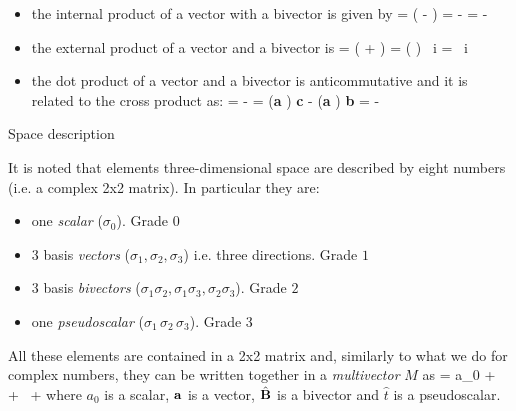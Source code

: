 \documentclass[handout,10pt]{beamer}
\begin{document}

\begin{frame}[fragile]{}
\begin{itemize}

\item the internal product of a vector with a bivector is given by
\be 
\Ba \cdot \hat{\BB}  =  \left(\Ba \hat{\BB} - \hat{\BB} \Ba \right) = - \Ba \times \Bb \times \Bc = - \Ba \times \BB
\ee
\item the external product of a vector and a bivector is
%
\be 
\Ba \wedge \hat{\BB}  =  \left(\Ba \hat{\BB} + \hat{\BB} \Ba \right) =  \Ba \cdot \left( \Bb \times \Bc\right) \,  i  =  \Ba \cdot  \BB  \,  i 
\ee

\item the dot product of a vector and a bivector is anticommutative and it is related to the cross product as:
\be \label{adbwcatbtccs}
\Ba \cdot \Bb \wedge \Bc = - \Ba \times \Bb \times \Bc = ({\bf a}  )    {\bf c} - ({\bf a}  )  {\bf b} = -\Bb \wedge \Bc \cdot \Ba
\ee

\end{itemize}

\end{frame}

\begin{frame}[fragile]{Space description}


It is noted that elements  three-dimensional space are described by eight numbers (i.e. a complex 2x2 matrix). In particular they are: 
\begin{itemize}
\item one \emph{scalar} ($\sigma_0$). Grade $0$
\item 3 basis \emph{vectors} ($\sigma_1, \sigma_2, \sigma_3$) i.e. three directions. Grade $1$
\item 3 basis \emph{bivectors} ($\sigma_1 \sigma_2, \sigma_1 \sigma_3, \sigma_2 \sigma_3$). Grade $2$
\item one \emph{pseudoscalar} ($\sigma_1 \, \sigma_2 \, \sigma_3$). Grade $3$
\end{itemize}
%
All these elements are contained in a 2x2 matrix and, similarly to what we do for complex numbers, they can be written together in a 
\alert{ \emph{multivector} $\mathit{M}$} as
\be \label{Mmultivector}
 = 
a_0 + \, \Ba + \, \hat{\BB} +  
\ee
where $a_0$ is a scalar, $\mathbf{a}$ is a vector, $\hat{\mathbf{B}}$ is a bivector and $\hat{\mathit{t}}$ is a pseudoscalar.

\end{frame}
\end{document}

